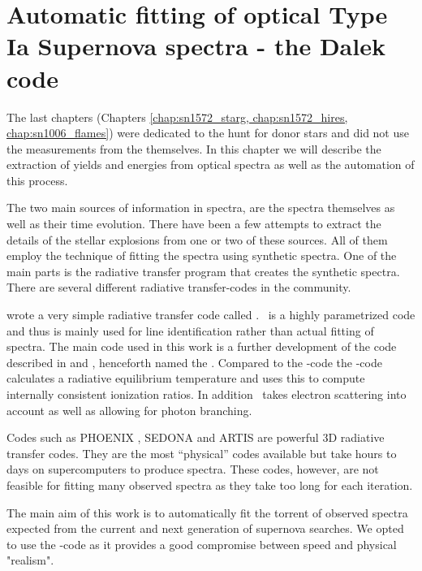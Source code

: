 \chapter{Automatic fitting of optical Type Ia Supernova spectra - the Dalek code}
\label{chap:dalek}

The last chapters (Chapters \ref{chap:sn1572_starg, chap:sn1572_hires, chap:sn1006_flames}) were dedicated to the hunt for donor stars and did not use the measurements from the \sneia themselves. In this chapter we will describe the extraction of yields and energies from optical spectra as well as the automation of this process.

The two main sources of information in spectra, are the spectra themselves as well as their time evolution. There have been a few attempts to extract the details of the stellar explosions from one or two of these sources. All of them employ the technique of fitting the spectra using synthetic spectra. One of the main parts is the radiative transfer program that creates the synthetic spectra. There are several different radiative transfer-codes in the community. 


\cite{2000PhDT.........6F} wrote a very simple radiative transfer code called \synow. \synow\ is a highly parametrized code and thus is mainly used for line identification rather than actual fitting of \snia spectra. 
The main code used in this work is a further development of the code described in  \citet{1993A&A...279..447M}  and \citet{2000A&A...363..705M}, henceforth named the \mlc. Compared to the \synow-code the \mlc-code calculates a radiative equilibrium temperature and uses this to compute internally consistent ionization ratios. In addition \mlc\ takes electron scattering into account as well as allowing for photon branching. 


Codes such as PHOENIX \cite{1999JCoAM.109...41H}, SEDONA \cite{2006ApJ...651..366K} and ARTIS \cite{2009MNRAS.398.1809K} are powerful 3D radiative transfer codes. They are the most ``physical'' codes available but take hours to days on supercomputers to produce spectra. These codes, however, are not feasible for fitting many observed spectra as they take too long for each iteration. 

The main aim of this work is to automatically fit the torrent of observed spectra expected from the current and next generation of supernova searches. We opted to use the \mlc-code as it provides a good compromise between speed and physical "realism". 

